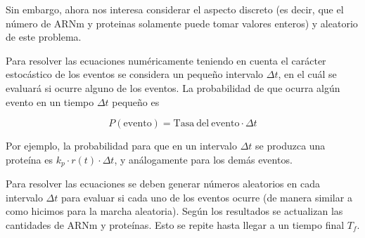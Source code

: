 \documentclass[11pt,letterpaper]{exam}
\begin{document}
\begin{questions}
Sin embargo, ahora nos interesa considerar el aspecto
discreto (es decir, que el n\'umero de ARNm y proteinas solamente puede
tomar valores enteros) y aleatorio de este problema. 

Para resolver las ecuaciones num\'ericamente teniendo en cuenta el
car\'acter estoc\'astico de los  eventos se considera un peque\~no
intervalo $\Delta t$, en el cu\'al se evaluar\'a si ocurre alguno de
los eventos. 
La probabilidad de que ocurra alg\'un evento en un tiempo $\Delta t$
peque\~no es  

\begin{equation*}
P(\mathrm{evento}) = \mathrm{Tasa\ del\ evento}\cdot \Delta t
\end{equation*}

Por ejemplo, la probabilidad para que en un intervalo $\Delta t$ se
produzca una prote\'ina es $k_p\cdot r(t)\cdot\Delta t$, y
an\'alogamente para los dem\'as eventos. 

Para resolver las ecuaciones se deben generar n\'umeros aleatorios
en cada intervalo $\Delta t$ para evaluar si cada uno  de los eventos
ocurre (de manera similar a como hicimos para la marcha
aleatoria). Seg\'un los resultados se actualizan las cantidades de
ARNm y prote\'inas. Esto se repite hasta llegar a un tiempo final
$T_f$.   


\end{questions}
\end{document}
